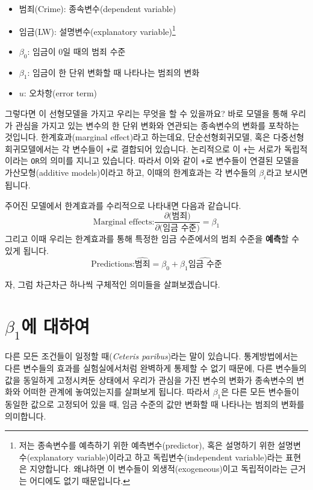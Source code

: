 \documentclass[
]{book}
\providecommand{\tightlist}{%
  \setlength{\itemsep}{0pt}\setlength{\parskip}{0pt}}
\begin{document}
\begin{itemize}
\tightlist
\item
  범죄(Crime): 종속변수(dependent variable)
\item
  임금(LW): 설명변수(explanatory variable)\footnote{저는 종속변수를 예측하기 위한 예측변수(predictor), 혹은 설명하기 위한 설명변수(explanatory variable)이라고 하고 독립변수(independent variable)라는 표현은 지양합니다. 왜냐하면 이 변수들이 외생적(exogeneous)이고 독립적이라는 근거는 어디에도 없기 때문입니다.}
\item
  \(\beta_0\): 임금이 0일 때의 범죄 수준
\item
  \(\beta_1\): 임금이 한 단위 변화할 때 나타나는 범죄의 변화
\item
  \(u\): 오차항(error term)
\end{itemize}

그렇다면 이 선형모델을 가지고 우리는 무엇을 할 수 있을까요? 바로 모델을 통해 우리가 관심을 가지고 있는 변수의 한 단위 변화와 연관되는 종속변수의 변화를 포착하는 것입니다. 한계효과(marginal effect)라고 하는데요, 단순선형회귀모델, 혹은 다중선형회귀모델에서는 각 변수들이 \texttt{+}로 결합되어 있습니다. 논리적으로 이 \texttt{+}는 서로가 독립적이라는 \texttt{OR}의 의미를 지니고 있습니다. 따라서 이와 같이 \texttt{+}로 변수들이 연결된 모델을 가산모형(additive models)이라고 하고, 이때의 한계효과는 각 변수들의 \(\beta_i\)라고 보시면 됩니다.

주어진 모델에서 한계효과를 수리적으로 나타내면 다음과 같습니다.
\[\text{Marginal effects:} \frac{\partial\text{(범죄)}}{\partial\text{(임금 수준)}} = \beta_1\]
그리고 이때 우리는 한계효과를 통해 특정한 임금 수준에서의 범죄 수준을 \textbf{예측}할 수 있게 됩니다.
\[\text{Predictions:} \hat{\text{범죄}} = \beta_0 + \beta_1\hat{\text{임금 수준}}\]

자, 그럼 차근차근 하나씩 구체적인 의미들을 살펴보겠습니다.

\hypertarget{beta_1uxc5d0-uxb300uxd558uxc5ec}{%
\section{\texorpdfstring{\(\beta_1\)에 대하여}{\textbackslash beta\_1에 대하여}}\label{beta_1uxc5d0-uxb300uxd558uxc5ec}}

다른 모든 조건들이 일정할 때(\emph{Ceteris paribus})라는 말이 있습니다. 통계방법에서는 다른 변수들의 효과를 실험실에서처럼 완벽하게 통제할 수 없기 때문에, 다른 변수들의 값을 동일하게 고정시켜둔 상태에서 우리가 관심을 가진 변수의 변화가 종속변수의 변화와 어떠한 관계에 놓여있는지를 살펴보게 됩니다. 따라서 \(\beta_1\)은 다른 모든 변수들이 동일한 값으로 고정되어 있을 때, 임금 수준의 값만 변화할 때 나타나는 범죄의 변화를 의미합니다.
\end{document}
